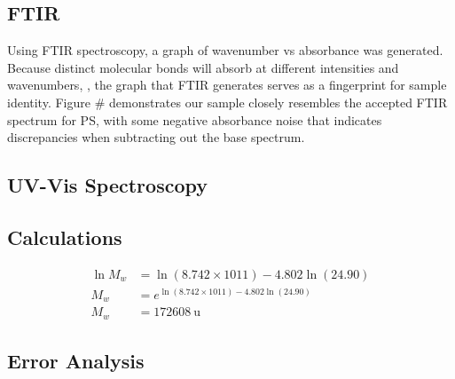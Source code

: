 \documentclass{article}
\begin{document}
\begin{multicols}{2}
            \subsection{FTIR}
                Using FTIR spectroscopy, a graph of wavenumber vs absorbance  was generated. Because distinct  molecular bonds will absorb at different intensities and wavenumbers, , the graph that FTIR generates serves as a fingerprint for sample identity. Figure \# demonstrates our sample closely resembles the accepted FTIR spectrum for PS, with some negative absorbance noise that indicates discrepancies when subtracting out the base spectrum.
            \subsection{UV-Vis Spectroscopy}
            \subsection{Calculations}
                \begin{align}
                    \ln{M_w} &= \ln{(8.742 \times 1011)} - 4.802 \ln{(24.90)}\\
                    M_w &= e^{\ln{(8.742 \times 1011)} - 4.802 \ln{(24.90)}} \nonumber\\
                    M_w &= \qty{172608}{\atomicmassunit} \nonumber
                \end{align}
            \subsection{Error Analysis}

\end{multicols}
\end{document}
